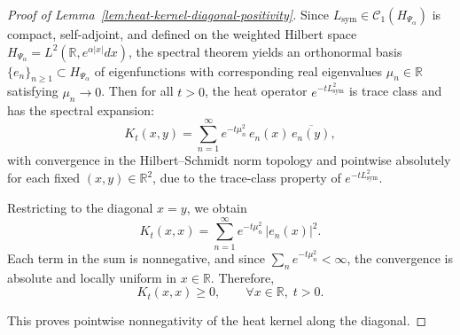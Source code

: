\begin{proof}[Proof of Lemma~\ref{lem:heat-kernel-diagonal-positivity}]
Since \( L_{\mathrm{sym}} \in \mathcal{C}_1(H_{\Psi_\alpha}) \) is compact, self-adjoint, and defined on the weighted Hilbert space \( H_{\Psi_\alpha} = L^2(\mathbb{R}, e^{\alpha|x|} dx) \), the spectral theorem yields an orthonormal basis \( \{e_n\}_{n \geq 1} \subset H_{\Psi_\alpha} \) of eigenfunctions with corresponding real eigenvalues \( \mu_n \in \mathbb{R} \) satisfying \( \mu_n \to 0 \). Then for all \( t > 0 \), the heat operator \( e^{-t L_{\mathrm{sym}}^2} \) is trace class and has the spectral expansion:
\[
K_t(x,y) = \sum_{n=1}^\infty e^{-t \mu_n^2} \, e_n(x) \, \overline{e_n(y)},
\]
with convergence in the Hilbert–Schmidt norm topology and pointwise absolutely for each fixed \( (x,y) \in \mathbb{R}^2 \), due to the trace-class property of \( e^{-t L_{\mathrm{sym}}^2} \).

Restricting to the diagonal \( x = y \), we obtain
\[
K_t(x,x) = \sum_{n=1}^\infty e^{-t \mu_n^2} \, |e_n(x)|^2.
\]
Each term in the sum is nonnegative, and since \( \sum_{n} e^{-t \mu_n^2} < \infty \), the convergence is absolute and locally uniform in \( x \in \mathbb{R} \). Therefore,
\[
K_t(x,x) \geq 0, \qquad \forall x \in \mathbb{R}, \; t > 0.
\]

This proves pointwise nonnegativity of the heat kernel along the diagonal.
\end{proof}
